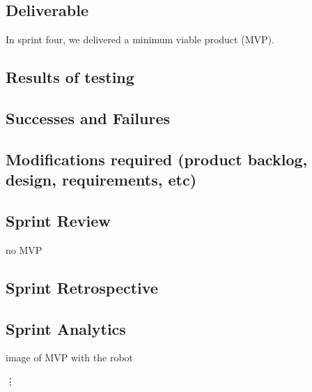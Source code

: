\subsection{Deliverable}

In sprint four, we delivered a minimum viable product (MVP).

\subsection{Results of testing}
\subsection{Successes and Failures}
\subsection{Modifications required (product backlog, design, requirements, etc)}
\subsection{Sprint Review}

no MVP
\subsection{Sprint Retrospective}
\subsection{Sprint Analytics} 
image of MVP with the robot 

\vdots

